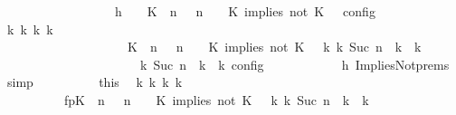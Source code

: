 \begin{isabellebody}
\ \ \ \ \ \ \isamarkupfalse%
\ {\isacharminus}\isanewline
\ \ \ \ \ \ \ \ \isamarkupfalse%
\ h{}{\isacharcolon}\ {\isacartoucheopen}{\isasymrho}\ {\isasymin}\ {\isasymlbrakk}\ {\isacharparenleft}{\isacharparenleft}K\ {\isasymnot}{\isasymUp}\ n{\isacharparenright}\ {\isacharhash}\ {\isasymGamma}{\isacharparenright}{\isacharcomma}\ n\ {\isasymturnstile}\ {\isasymPsi}\ {\isasymtriangleright}\ {\isacharparenleft}{\isacharparenleft}K\ implies\ not\ K\ {\isacharhash}\ {\isasymPhi}{\isacharparenright}\ {\isasymrbrakk}\isactrlsub c\isactrlsub o\isactrlsub n\isactrlsub f\isactrlsub i\isactrlsub g{\isacartoucheclose}\isanewline
\ \ \ \ \ \ \ \ \isamarkupfalse%
\ \isamarkupfalse%
\ {\isacartoucheopen}{\isasymexists}{\isasymGamma}\isactrlsub k\ {\isasymPsi}\isactrlsub k\ {\isasymPhi}\isactrlsub k\ k{\isachardot}\isanewline
\ \ \ \ \ \ \ \ \ \ \ \ \ \ \ \ \ \ \ \ {\isacharparenleft}{\isacharparenleft}{\isacharparenleft}{\isacharparenleft}K\ {\isasymnot}{\isasymUp}\ n{\isacharparenright}\ {\isacharhash}\ {\isasymGamma}{\isacharparenright}{\isacharcomma}\ n\ {\isasymturnstile}\ {\isasymPsi}\ {\isasymtriangleright}\ {\isacharparenleft}{\isacharparenleft}K\ implies\ not\ K\ {\isacharhash}\ {\isasymPhi}{\isacharparenright}{\isacharparenright}\ {\isasymhookrightarrow}\isactrlbsup k\isactrlesup \ {\isacharparenleft}{\isasymGamma}\isactrlsub k{\isacharcomma}\ Suc\ n\ {\isasymturnstile}\ {\isasymPsi}\isactrlsub k\ {\isasymtriangleright}\ {\isasymPhi}\isactrlsub k{\isacharparenright}{\isacharparenright}\isanewline
\ \ \ \ \ \ \ \ \ \ \ \ \ \ \ \ \ \ {\isasymand}\ {\isasymrho}\ {\isasymin}\ {\isasymlbrakk}\ {\isasymGamma}\isactrlsub k{\isacharcomma}\ Suc\ n\ {\isasymturnstile}\ {\isasymPsi}\isactrlsub k\ {\isasymtriangleright}\ {\isasymPhi}\isactrlsub k\ {\isasymrbrakk}\isactrlsub c\isactrlsub o\isactrlsub n\isactrlsub f\isactrlsub i\isactrlsub g{\isacartoucheclose}\isanewline
\ \ \ \ \ \ \ \ \ \ \isamarkupfalse%
\ h{}\ ImpliesNot{\isachardot}prems\ \isamarkupfalse%
\ simp\isanewline
\ \ \ \ \ \ \ \ \isamarkupfalse%
\ this\ \isamarkupfalse%
\ {\isasymGamma}\isactrlsub k\ {\isasymPsi}\isactrlsub k\ {\isasymPhi}\isactrlsub k\ k\ \isanewline
\ \ \ \ \ \ \ \ \ \ fp{\isacharcolon}{\isacartoucheopen}{\isacharparenleft}{\isacharparenleft}{\isacharparenleft}{\isacharparenleft}K\ {\isasymnot}{\isasymUp}\ n{\isacharparenright}\ {\isacharhash}\ {\isasymGamma}{\isacharparenright}{\isacharcomma}\ n\ {\isasymturnstile}\ {\isasymPsi}\ {\isasymtriangleright}\ {\isacharparenleft}{\isacharparenleft}K\ implies\ not\ K\ {\isacharhash}\ {\isasymPhi}{\isacharparenright}{\isacharparenright}\ {\isasymhookrightarrow}\isactrlbsup k\isactrlesup \ {\isacharparenleft}{\isasymGamma}\isactrlsub k{\isacharcomma}\ Suc\ n\ {\isasymturnstile}\ {\isasymPsi}\isactrlsub k\ {\isasymtriangleright}\ {\isasymPhi}\isactrlsub k{\isacharparenright}{\isacharparenright}{\isacartoucheclose}\isanewline

\end{isabellebody}
